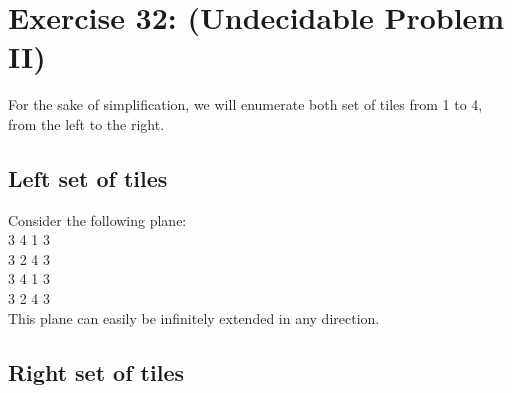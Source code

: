 \documentclass[12pt]{article}
\begin{document}
\section*{Exercise 32: (Undecidable Problem II)}

For the sake of simplification, we will enumerate both set of tiles from 1 to 4, from the left to the right.

\subsection*{Left set of tiles}

Consider the following plane:\\
3 4 1 3\\
3 2 4 3\\
3 4 1 3\\
3 2 4 3\\
This plane can easily be infinitely extended in any direction.

\subsection*{Right set of tiles}

\end{document}
